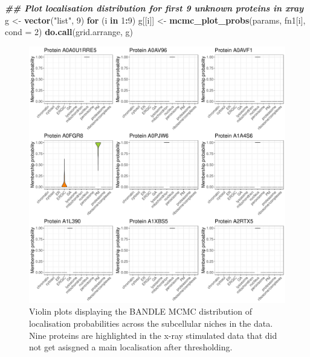 \documentclass[9pt,a4paper,]{extarticle}
\newenvironment{Shaded}{\begin{snugshade}}{\end{snugshade}}
\newcommand{\AttributeTok}[1]{\textcolor[rgb]{0.13,0.29,0.53}{#1}}
\newcommand{\ControlFlowTok}[1]{\textcolor[rgb]{0.13,0.29,0.53}{\textbf{#1}}}
\newcommand{\DecValTok}[1]{\textcolor[rgb]{0.00,0.00,0.81}{#1}}
\newcommand{\DocumentationTok}[1]{\textcolor[rgb]{0.56,0.35,0.01}{\textbf{\textit{#1}}}}
\newcommand{\FunctionTok}[1]{\textcolor[rgb]{0.13,0.29,0.53}{\textbf{#1}}}
\newcommand{\NormalTok}[1]{#1}
\newcommand{\OtherTok}[1]{\textcolor[rgb]{0.56,0.35,0.01}{#1}}
\newcommand{\SpecialCharTok}[1]{\textcolor[rgb]{0.81,0.36,0.00}{\textbf{#1}}}
\newcommand{\StringTok}[1]{\textcolor[rgb]{0.31,0.60,0.02}{#1}}
\begin{document}
\begin{Shaded}
\begin{Highlighting}[]
\DocumentationTok{\#\# Plot localisation distribution for first 9 unknown proteins in xray}
\NormalTok{g }\OtherTok{\textless{}{-}} \FunctionTok{vector}\NormalTok{(}\StringTok{"list"}\NormalTok{, }\DecValTok{9}\NormalTok{)}
\ControlFlowTok{for}\NormalTok{ (i }\ControlFlowTok{in} \DecValTok{1}\SpecialCharTok{:}\DecValTok{9}\NormalTok{) g[[i]] }\OtherTok{\textless{}{-}} \FunctionTok{mcmc\_plot\_probs}\NormalTok{(params, fn1[i], }\AttributeTok{cond =} \DecValTok{2}\NormalTok{)}
\FunctionTok{do.call}\NormalTok{(grid.arrange, g)}
\end{Highlighting}
\end{Shaded}

\begin{figure}[H]

{\centering \includegraphics[width=1\linewidth,]{figs/xray_unknown_violins} 

}

\caption{Violin plots displaying the BANDLE MCMC distribution of localisation probabilities across the subcellular niches in the data. Nine proteins are highlighted in the x-ray stimulated data that did not get asisgned a main localisation after thresholding.}\label{fig:bandle-violin2}
\end{figure}
\end{document}
